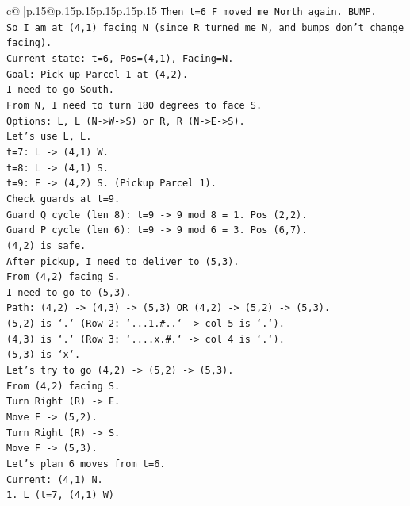 \documentclass{article}
\begin{document}
{\begin{supertabular}{c@{$\;$}|p{.15\linewidth}@{}p{.15\linewidth}p{.15\linewidth}p{.15\linewidth}p{.15\linewidth}p{.15\linewidth}}
{{{\texttt{Then t=6 F moved me North again. BUMP.} \\
\texttt{So I am at (4,1) facing N (since R turned me N, and bumps don't change facing).} \\
\texttt{Current state: t=6, Pos=(4,1), Facing=N.} \\
\texttt{Goal: Pick up Parcel 1 at (4,2).} \\
\texttt{I need to go South.} \\
\texttt{From N, I need to turn 180 degrees to face S.} \\
\texttt{Options: L, L (N{-}>W{-}>S) or R, R (N{-}>E{-}>S).} \\
\texttt{Let's use L, L.} \\
\texttt{t=7: L {-}> (4,1) W.} \\
\texttt{t=8: L {-}> (4,1) S.} \\
\texttt{t=9: F {-}> (4,2) S. (Pickup Parcel 1).} \\
\texttt{Check guards at t=9.} \\
\texttt{Guard Q cycle (len 8): t=9 {-}> 9 mod 8 = 1. Pos (2,2).} \\
\texttt{Guard P cycle (len 6): t=9 {-}> 9 mod 6 = 3. Pos (6,7).} \\
\texttt{(4,2) is safe.} \\
\texttt{After pickup, I need to deliver to (5,3).} \\
\texttt{From (4,2) facing S.} \\
\texttt{I need to go to (5,3).} \\
\texttt{Path: (4,2) {-}> (4,3) {-}> (5,3) OR (4,2) {-}> (5,2) {-}> (5,3).} \\
\texttt{(5,2) is `.` (Row 2: `...1.\#..` {-}> col 5 is `.`).} \\
\texttt{(4,3) is `.` (Row 3: `....x.\#.` {-}> col 4 is `.`).} \\
\texttt{(5,3) is `x`.} \\
\texttt{Let's try to go (4,2) {-}> (5,2) {-}> (5,3).} \\
\texttt{From (4,2) facing S.} \\
\texttt{Turn Right (R) {-}> E.} \\
\texttt{Move F {-}> (5,2).} \\
\texttt{Turn Right (R) {-}> S.} \\
\texttt{Move F {-}> (5,3).} \\
\texttt{Let's plan 6 moves from t=6.} \\
\texttt{Current: (4,1) N.} \\
\texttt{1. L (t=7, (4,1) W)} \\
}}}
\end{supertabular}}
\end{document}
